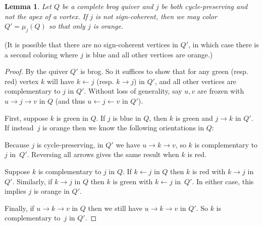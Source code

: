 \documentclass[12pt]{amsart}
\newtheorem{lem}[thm]{Lemma}
\theoremstyle{definition}
\theoremstyle{remark}
\numberwithin{equation}{section}
\begin{document}
\begin{lem}
\label{lem: orange away}
Let $Q$ be a complete brog quiver and $j$ be both cycle-preserving and not the apex of a vortex.
If $j$ is not sign-coherent, then we may color $Q' = \mu_{j}(Q)$ so that only $j$ is orange.
\end{lem}

(It is possible that there are no sign-coherent vertices in $Q'$, in which case there is a second coloring where $j$ is blue and all other vertices are orange.) %

\begin{proof}
By  the quiver $Q'$ is brog. 
So it suffices to show that for any green (resp. red) vertex $k$ will have $k \leftarrow j$ (resp. $k \rightarrow j$) in $Q'$, and all other vertices are complementary to $j$ in $Q'$.
Without loss of generality, say $u,v$ are frozen with $u \rightarrow j \rightarrow v$ in $Q$ (and thus $u \leftarrow j \leftarrow v$ in $Q'$).

First, suppose $k$ is green in $Q$. If $j$ is blue in $Q$, then $k$ is green and $j \rightarrow k$ in $Q'$. 
If instead~$j$ is orange then we know the following orientations in $Q$:
\begin{center}
        

\end{center}
Because $j$ is cycle-preserving, in $Q'$ we have $u \rightarrow k \rightarrow v$, so $k$ is complementary to $j$ in~$Q'$. Reversing all arrows gives the same result when $k$ is red.

Suppose $k$ is complementary to $j$ in $Q$. 
If $k \leftarrow j$ in $Q$ then $k$ is red with $k \rightarrow j$ in~$Q'$.
Similarly, if $k \rightarrow j$ in $Q$ then $k$ is green with $k \leftarrow j$ in~$Q'$.
In either case, this implies $j$ is orange in $Q'$.

Finally, if $u \rightarrow k \rightarrow v$ in $Q$ then we still have $u \rightarrow k \rightarrow v$ in $Q'$. %
So $k$ is complementary to~$j$ in $Q'$.
\end{proof}
\end{document}
